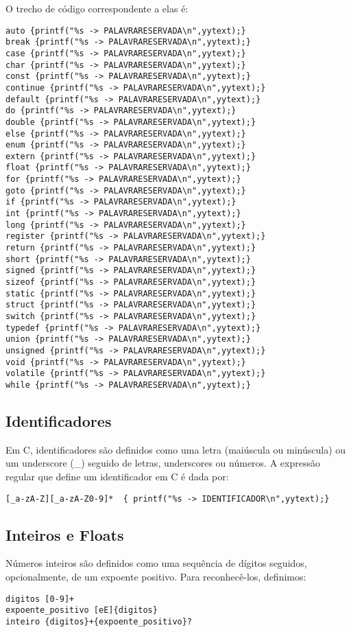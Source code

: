 \documentclass[a4paper,10pt]{article}
\begin{document}
  O trecho de código correspondente a elas é:
  \begin{verbatim}
auto {printf("%s -> PALAVRARESERVADA\n",yytext);}
break {printf("%s -> PALAVRARESERVADA\n",yytext);}
case {printf("%s -> PALAVRARESERVADA\n",yytext);}
char {printf("%s -> PALAVRARESERVADA\n",yytext);}
const {printf("%s -> PALAVRARESERVADA\n",yytext);}
continue {printf("%s -> PALAVRARESERVADA\n",yytext);}
default {printf("%s -> PALAVRARESERVADA\n",yytext);}
do {printf("%s -> PALAVRARESERVADA\n",yytext);}
double {printf("%s -> PALAVRARESERVADA\n",yytext);}
else {printf("%s -> PALAVRARESERVADA\n",yytext);}
enum {printf("%s -> PALAVRARESERVADA\n",yytext);}
extern {printf("%s -> PALAVRARESERVADA\n",yytext);}
float {printf("%s -> PALAVRARESERVADA\n",yytext);}
for {printf("%s -> PALAVRARESERVADA\n",yytext);}
goto {printf("%s -> PALAVRARESERVADA\n",yytext);}
if {printf("%s -> PALAVRARESERVADA\n",yytext);}
int {printf("%s -> PALAVRARESERVADA\n",yytext);}
long {printf("%s -> PALAVRARESERVADA\n",yytext);}
register {printf("%s -> PALAVRARESERVADA\n",yytext);}
return {printf("%s -> PALAVRARESERVADA\n",yytext);}
short {printf("%s -> PALAVRARESERVADA\n",yytext);}
signed {printf("%s -> PALAVRARESERVADA\n",yytext);}
sizeof {printf("%s -> PALAVRARESERVADA\n",yytext);}
static {printf("%s -> PALAVRARESERVADA\n",yytext);}
struct {printf("%s -> PALAVRARESERVADA\n",yytext);}
switch {printf("%s -> PALAVRARESERVADA\n",yytext);}
typedef {printf("%s -> PALAVRARESERVADA\n",yytext);}
union {printf("%s -> PALAVRARESERVADA\n",yytext);}
unsigned {printf("%s -> PALAVRARESERVADA\n",yytext);}
void {printf("%s -> PALAVRARESERVADA\n",yytext);}
volatile {printf("%s -> PALAVRARESERVADA\n",yytext);}
while {printf("%s -> PALAVRARESERVADA\n",yytext);}

  \end{verbatim} 

  \subsection{Identificadores}
  Em C, identificadores são definidos como uma letra (maiúscula ou minúscula) ou um underscore (\_) seguido de letras, underscores ou
  números. A expressão regular que define um identificador em C é dada por:
  \begin{verbatim}
[_a-zA-Z][_a-zA-Z0-9]*	{ printf("%s -> IDENTIFICADOR\n",yytext);}
  \end{verbatim}
  

\subsection{Inteiros e Floats}
  Números inteiros são definidos como uma sequência de dígitos seguidos, opcionalmente, de um expoente positivo. Para reconhecê-los,
  definimos:
  \begin{verbatim}
digitos [0-9]+ 
expoente_positivo [eE]{digitos}
inteiro {digitos}+{expoente_positivo}?
\end{verbatim}
\end{document}
